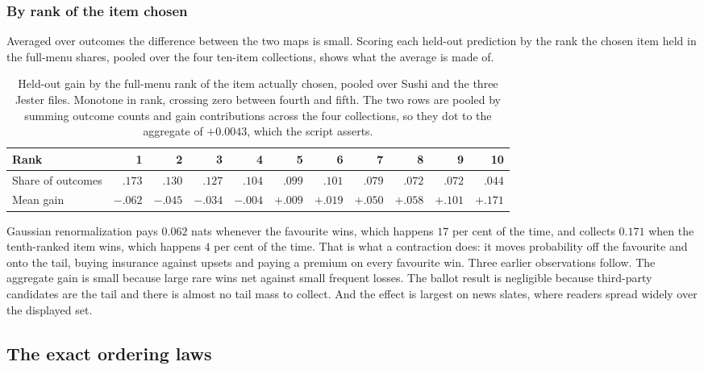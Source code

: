 \documentclass[11pt]{article}
\begin{document}
\subsubsection{By rank of the item chosen}
\label{sec:where}

Averaged over outcomes the difference between the two maps is small. Scoring each held-out
prediction by the rank the chosen item held in the full-menu shares, pooled over the four
ten-item collections, shows what the average is made of.

\begin{table}[ht]
\centering
\small
\setlength{\tabcolsep}{4pt}
\begin{tabular}{lrrrrrrrrrr}
\toprule
Rank & 1 & 2 & 3 & 4 & 5 & 6 & 7 & 8 & 9 & 10 \\
\midrule
Share of outcomes & $.173$ & $.130$ & $.127$ & $.104$ & $.099$ & $.101$ & $.079$ & $.072$ & $.072$ & $.044$ \\
Mean gain & $-.062$ & $-.045$ & $-.034$ & $-.004$ & $+.009$ & $+.019$ & $+.050$ & $+.058$ & $+.101$ & $+.171$ \\
\bottomrule
\end{tabular}
\caption{Held-out gain by the full-menu rank of the item actually chosen, pooled over Sushi
and the three Jester files. Monotone in rank, crossing zero between fourth and fifth. The two
rows are pooled by summing outcome counts and gain contributions across the four
collections, so they dot to the aggregate of $+0.0043$, which the script asserts.}
\label{tab:byrank}
\end{table}

Gaussian renormalization pays $0.062$ nats whenever the favourite wins, which happens $17$ per
cent of the time, and collects $0.171$ when the tenth-ranked item wins, which happens $4$ per
cent of the time. That is what a contraction does: it moves probability off the favourite and onto the
tail, buying insurance against upsets and paying a premium on every favourite win. Three
earlier observations follow. The aggregate gain is small because large rare wins net against
small frequent losses. The ballot result is negligible because third-party candidates are the
tail and there is almost no tail mass to collect. And the effect is largest on news slates,
where readers spread widely over the displayed set.

\subsection{The exact ordering laws}
\label{sec:sequential}
\end{document}
